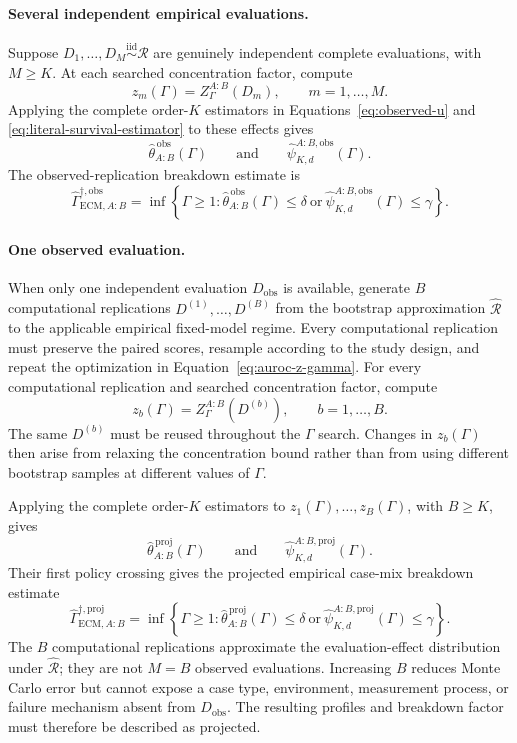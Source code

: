 \documentclass[11pt]{article}
\newcommand{\Regime}{\mathcal{R}}
\newcommand{\iid}{\mathrel{\overset{\mathrm{iid}}{\sim}}}
\theoremstyle{remark}
\begin{document}
\paragraph{Several independent empirical evaluations.}
Suppose $D_1,\ldots,D_M\iid\Regime$ are genuinely independent complete
evaluations, with $M\geq K$. At each searched concentration factor, compute
\[
z_m(\Gamma)
=
Z_\Gamma^{A:B}(D_m),
\qquad m=1,\ldots,M.
\]
Applying the complete order-$K$ estimators in
Equations~\eqref{eq:observed-u} and
\eqref{eq:literal-survival-estimator} to these effects gives
\[
\widehat\theta_{A:B}^{\,\mathrm{obs}}(\Gamma)
\qquad\text{and}\qquad
\widehat\psi_{K,d}^{A:B,\mathrm{obs}}(\Gamma).
\]
The observed-replication breakdown estimate is
\begin{equation}
\widehat\Gamma_{\mathrm{ECM},A:B}^{\dagger,\mathrm{obs}}
=
\inf\left\{
\Gamma\geq1:
\widehat\theta_{A:B}^{\,\mathrm{obs}}(\Gamma)\leq\delta
\ \text{or}\ 
\widehat\psi_{K,d}^{A:B,\mathrm{obs}}(\Gamma)\leq\gamma
\right\}.
\label{eq:auroc-ecm-breakdown-observed}
\end{equation}

\paragraph{One observed evaluation.}
When only one independent evaluation $D_{\mathrm{obs}}$ is available, generate
$B$ computational replications $D^{(1)},\ldots,D^{(B)}$ from the bootstrap
approximation $\widehat{\Regime}$ to the applicable empirical fixed-model
regime. Every computational replication must preserve the paired scores,
resample according to the study design, and repeat the optimization in
Equation~\eqref{eq:auroc-z-gamma}. For every computational replication and
searched concentration factor, compute
\[
z_b(\Gamma)
=
Z_\Gamma^{A:B}\!\left(D^{(b)}\right),
\qquad b=1,\ldots,B.
\]
The same $D^{(b)}$ must be reused throughout the $\Gamma$ search. Changes in
$z_b(\Gamma)$ then arise from relaxing the concentration bound rather than from
using different bootstrap samples at different values of $\Gamma$.

Applying the complete order-$K$ estimators to
$z_1(\Gamma),\ldots,z_B(\Gamma)$, with $B\geq K$, gives
\[
\widehat\theta_{A:B}^{\,\mathrm{proj}}(\Gamma)
\qquad\text{and}\qquad
\widehat\psi_{K,d}^{A:B,\mathrm{proj}}(\Gamma).
\]
Their first policy crossing gives the projected empirical case-mix breakdown
estimate
\begin{equation}
\widehat\Gamma_{\mathrm{ECM},A:B}^{\dagger,\mathrm{proj}}
=
\inf\left\{
\Gamma\geq1:
\widehat\theta_{A:B}^{\,\mathrm{proj}}(\Gamma)\leq\delta
\ \text{or}\ 
\widehat\psi_{K,d}^{A:B,\mathrm{proj}}(\Gamma)\leq\gamma
\right\}.
\label{eq:auroc-ecm-breakdown-projected}
\end{equation}
The $B$ computational replications approximate the evaluation-effect
distribution under $\widehat{\Regime}$; they are not $M=B$ observed
evaluations. Increasing $B$ reduces Monte Carlo error but cannot expose a case
type, environment, measurement process, or failure mechanism absent from
$D_{\mathrm{obs}}$. The resulting profiles and breakdown factor must therefore
be described as projected.
\end{document}
